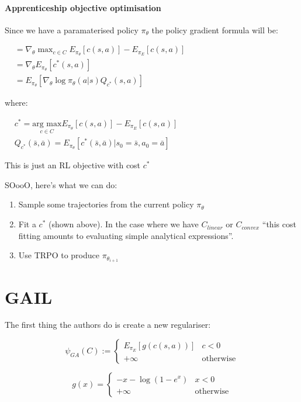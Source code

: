 \documentclass{article}
\begin{document}
\paragraph{Apprenticeship objective optimisation}
Since we have a paramaterised policy \(\pi_{\theta}\) the policy gradient formula will be:


\(
\begin{aligned}
  &=\nabla_{\theta} \max_{c \in C} E_{\pi_{\theta}}[c(s,a)] - E_{\pi_{E}}[c(s,a)] \\
  &=\nabla_{\theta} E_{\pi_{\theta}}[c^*(s,a)] \\
  &=E_{\pi_{\theta}}[\nabla_{\theta} \log \pi_{\theta} (a|s) Q_{c^{*}}(s,a)]
\end{aligned}
\)

where:

\(
\begin{aligned}
  &c^{*} = \underset{c \in C}{\text{arg max}} E_{\pi_{\theta}}[c(s,a)] - E_{\pi_{E}}[c(s,a)] \\
  &Q_{c^{*}}(\bar{s}, \bar{a}) = E_{\pi_{\theta}} [c^{*}(\bar{s}, \bar{a}) | s_{0} = \bar{s}, a_{0} = \bar{a}]
\end{aligned}
\)

This is just an RL objective with cost \(c^{*}\)

SOooO, here's what we can do:
\begin{enumerate}
\item Sample some trajectories from the current policy \(\pi_{\theta}\)
  \item Fit a \(c^{*}\) (shown above). In the case where we have \(C_{linear}\) or \(C_{convex}\) ``this cost fitting amounts to evaluating simple analytical expressions''.
    \item Use TRPO to produce \(\pi_{\theta_{i+1}}\)
\end{enumerate}

\section{GAIL}

The first thing the authors do is create a new regulariser:

\[\psi_{GA}(C) :=
  \begin{cases}
    E_{\pi_{E}}[g(c(s,a))] & c<0 \\
    +\infty & \text{otherwise}
  \end{cases}\]

\[
  g(x) =
  \begin{cases}
    -x-\log (1-e^{x}) & x < 0 \\
    +\infty & \text{otherwise}
    \end{cases}
\]
\end{document}
